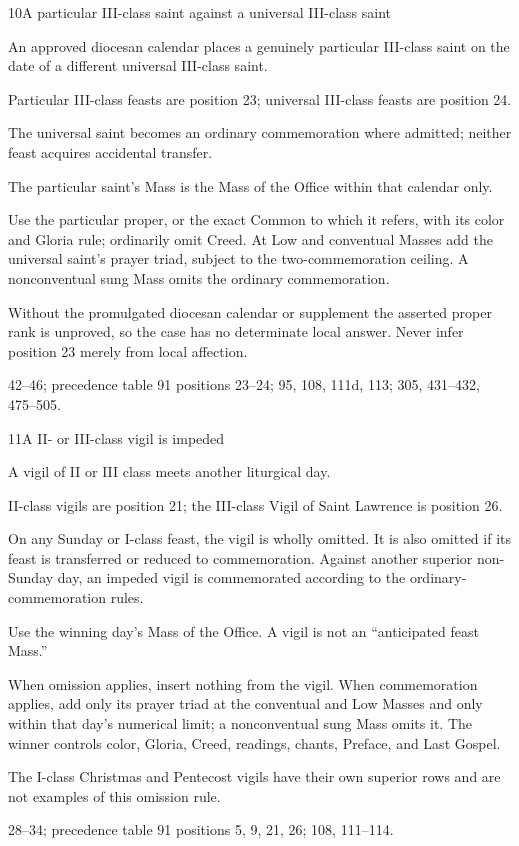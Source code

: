 \begin{casefile}{10}{A particular III-class saint against a universal III-class saint}
\item[Calendar facts] An approved diocesan calendar places a genuinely particular III-class saint on the date of a different universal III-class saint.
\item[Ranks and rows] Particular III-class feasts are position 23; universal III-class feasts are position 24.
\item[Impeded item] The universal saint becomes an ordinary commemoration where admitted; neither feast acquires accidental transfer.
\item[Mass category] The particular saint's Mass is the Mass of the Office within that calendar only.
\item[Assembly] Use the particular proper, or the exact Common to which it refers, with its color and Gloria rule; ordinarily omit Creed.  At Low and conventual Masses add the universal saint's prayer triad, subject to the two-commemoration ceiling.  A nonconventual sung Mass omits the ordinary commemoration.
\item[Boundary] Without the promulgated diocesan calendar or supplement the asserted proper rank is unproved, so the case has no determinate local answer.  Never infer position 23 merely from local affection.
\item[Rubric locus] 42--46; precedence table 91 positions 23--24; 95, 108, 111d, 113; 305, 431--432, 475--505.
\end{casefile}

\begin{casefile}{11}{A II- or III-class vigil is impeded}
\item[Calendar facts] A vigil of II or III class meets another liturgical day.
\item[Ranks and rows] II-class vigils are position 21; the III-class Vigil of Saint Lawrence is position 26.
\item[Impeded item] On any Sunday or I-class feast, the vigil is wholly omitted.  It is also omitted if its feast is transferred or reduced to commemoration.  Against another superior non-Sunday day, an impeded vigil is commemorated according to the ordinary-commemoration rules.
\item[Mass category] Use the winning day's Mass of the Office.  A vigil is not an “anticipated feast Mass.”
\item[Assembly] When omission applies, insert nothing from the vigil.  When commemoration applies, add only its prayer triad at the conventual and Low Masses and only within that day's numerical limit; a nonconventual sung Mass omits it.  The winner controls color, Gloria, Creed, readings, chants, Preface, and Last Gospel.
\item[Boundary] The I-class Christmas and Pentecost vigils have their own superior rows and are not examples of this omission rule.
\item[Rubric locus] 28--34; precedence table 91 positions 5, 9, 21, 26; 108, 111--114.
\end{casefile}

